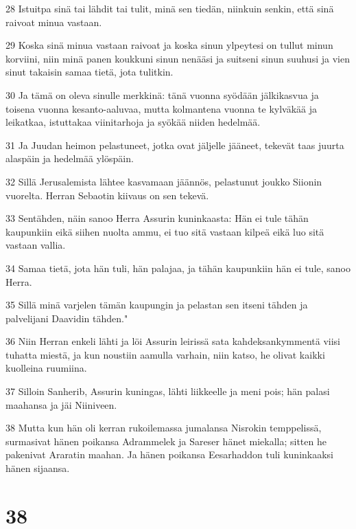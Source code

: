 \par 28 Istuitpa sinä tai lähdit tai tulit, minä sen tiedän, niinkuin senkin, että sinä raivoat minua vastaan.
\par 29 Koska sinä minua vastaan raivoat ja koska sinun ylpeytesi on tullut minun korviini, niin minä panen koukkuni sinun nenääsi ja suitseni sinun suuhusi ja vien sinut takaisin samaa tietä, jota tulitkin.
\par 30 Ja tämä on oleva sinulle merkkinä: tänä vuonna syödään jälkikasvua ja toisena vuonna kesanto-aaluvaa, mutta kolmantena vuonna te kylväkää ja leikatkaa, istuttakaa viinitarhoja ja syökää niiden hedelmää.
\par 31 Ja Juudan heimon pelastuneet, jotka ovat jäljelle jääneet, tekevät taas juurta alaspäin ja hedelmää ylöspäin.
\par 32 Sillä Jerusalemista lähtee kasvamaan jäännös, pelastunut joukko Siionin vuorelta. Herran Sebaotin kiivaus on sen tekevä.
\par 33 Sentähden, näin sanoo Herra Assurin kuninkaasta: Hän ei tule tähän kaupunkiin eikä siihen nuolta ammu, ei tuo sitä vastaan kilpeä eikä luo sitä vastaan vallia.
\par 34 Samaa tietä, jota hän tuli, hän palajaa, ja tähän kaupunkiin hän ei tule, sanoo Herra.
\par 35 Sillä minä varjelen tämän kaupungin ja pelastan sen itseni tähden ja palvelijani Daavidin tähden."
\par 36 Niin Herran enkeli lähti ja löi Assurin leirissä sata kahdeksankymmentä viisi tuhatta miestä, ja kun noustiin aamulla varhain, niin katso, he olivat kaikki kuolleina ruumiina.
\par 37 Silloin Sanherib, Assurin kuningas, lähti liikkeelle ja meni pois; hän palasi maahansa ja jäi Niiniveen.
\par 38 Mutta kun hän oli kerran rukoilemassa jumalansa Nisrokin temppelissä, surmasivat hänen poikansa Adrammelek ja Sareser hänet miekalla; sitten he pakenivat Araratin maahan. Ja hänen poikansa Eesarhaddon tuli kuninkaaksi hänen sijaansa.

\chapter{38}

